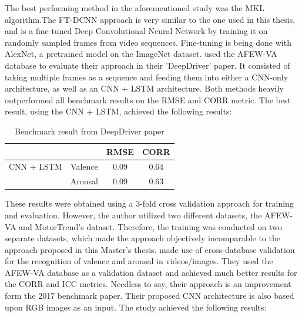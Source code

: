 The best performing method in the aforementioned study was the MKL algorithm.The FT-DCNN approach is very similar to the one used in this thesis, and is  a fine-tuned Deep Convolutional Neural Network by training it on randomly sampled frames from video sequences. Fine-tuning is being done with AlexNet, a pretrained model on the ImageNet dataset.
\newline\newline
\citet{Theagarajan:2018:DeepDriver} used the AFEW-VA database to evaluate their approach in their 'DeepDriver' paper. It consisted of taking multiple frames as a sequence and feeding them into either a CNN-only architecture, as well as an CNN + LSTM architecture. Both methods heavily outperformed all benchmark results on the RMSE and CORR metric. The best result, using the CNN + LSTM, achieved the following results:

\begin{table}[H]
\begin{center}
\begin{tabular}{@{}rccc@{}}
\toprule
\multicolumn{1}{c}{} &  & RMSE & CORR \\ \midrule
CNN + LSTM & Valence & 0.09 & 0.64 \\
 & \multicolumn{1}{l}{Arousal} & 0.09 & 0.63 \\ \bottomrule
\end{tabular}
\caption{Benchmark result from DeepDriver paper}
\label{tab:BenchmarkDeepDriver}
\end{center}
\end{table}

These results were obtained using a 3-fold cross validation approach for training and evaluation. However, the author utilized two different datasets, the AFEW-VA and MotorTrend's dataset. Therefore, the training was conducted on two separate datasets, which made the approach objectively incomparable to the approach proposed in this Master's thesis. 
\newline\newline
\citet{Handrich:2020:SimultaneousPredVA} made use of cross-database validation for the recognition of valence and arousal in videos/images. They used the AFEW-VA database \citep{Kossaifi:2017:AFEW-VADatabase} as a validation dataset and achieved much better results for the CORR and ICC metrics. Needless to say, their approach is an improvement form the 2017 benchmark paper. Their proposed CNN architecture is also based upon RGB images as an input. The study achieved the following results:

